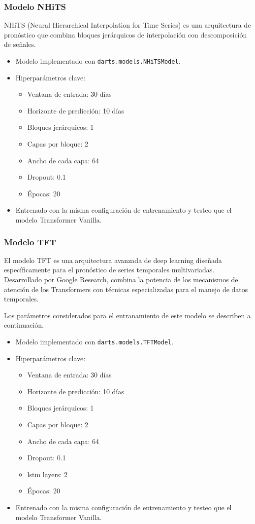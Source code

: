 \documentclass[12pt]{article}
\begin{document}
\subsubsection{Modelo NHiTS}

NHiTS (Neural Hierarchical Interpolation for Time Series) es una arquitectura de pronóstico que combina bloques jerárquicos de interpolación con descomposición de señales.

\begin{itemize}
\item Modelo implementado con \texttt{darts.models.NHiTSModel}.
\item Hiperparámetros clave:
\begin{itemize}
\item Ventana de entrada: 30 días
\item Horizonte de predicción: 10 días
\item Bloques jerárquicos: 1
\item Capas por bloque: 2
\item Ancho de cada capa: 64
\item Dropout: 0.1
\item Épocas: 20
\end{itemize}
\item Entrenado con la misma configuración de entrenamiento y testeo que el modelo Transformer Vanilla.
\end{itemize}

\subsubsection{Modelo TFT}
El modelo TFT es una arquitectura avanzada de deep learning diseñada específicamente para el pronóstico de series temporales multivariadas. Desarrollado por Google Research, combina la potencia de los mecanismos de atención de los Transformers con técnicas especializadas para el manejo de datos temporales.

Los parámetros considerados para el entranamiento de este modelo se describen a continuación.

\begin{itemize}
\item Modelo implementado con \texttt{darts.models.TFTModel}.
\item Hiperparámetros clave:
\begin{itemize}
\item Ventana de entrada: 30 días
\item Horizonte de predicción: 10 días
\item Bloques jerárquicos: 1
\item Capas por bloque: 2
\item Ancho de cada capa: 64
\item Dropout: 0.1
\item lstm layers: 2
\item Épocas: 20
\end{itemize}
\item Entrenado con la misma configuración de entrenamiento y testeo que el modelo Transformer Vanilla.
\end{itemize}
\end{document}
